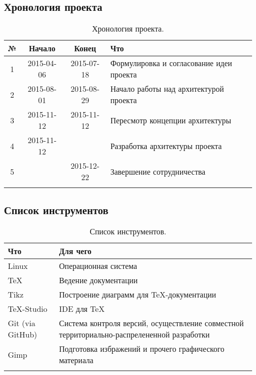 \documentclass[12pt,a4paper,fullpage,titlepage]{article}
\begin{document}
\subsection{Хронология проекта}
\begin{table}[h]
\begin{tabularx}{\textwidth}{|c|c|c|X|}
	\hline
	№ & Начало & Конец & Что\\
	\hline
	1 & 2015-04-06 & 2015-07-18 & Формулировка и согласование идеи проекта \\
	\hline
	2 & 2015-08-01 & 2015-08-29 & Начало работы над архитектурой проекта \\
	\hline
	3 & 2015-11-12 & 2015-11-12 & Пересмотр концепции архитектуры \\
	\hline
	4 & 2015-11-12 &  & Разработка архитектуры проекта\\
	\hline
	5 &  & 2015-12-22 & Завершение сотрудничества \\
	\hline
	&  &  &  \\
	\hline
\end{tabularx}
\caption{Хронология проекта.}
\end{table}

\newpage
\subsection{Список инструментов}
\begin{table}[h]
	\begin{tabularx}{\textwidth}{|l|X|}
		\hline
		Что & Для чего \\
		\hline
		Linux & Операционная система\\
		\hline
		\TeX & Ведение документации\\
		\hline
		Tikz & Построение диаграмм для \TeX-документации\\
		\hline
		\TeX-Studio & IDE для \TeX \\
		\hline
		Git (via GitHub) & Система контроля версий, осуществление совместной территориально-распрелененной разработки \\
		\hline
		Gimp & Подготовка избражений и прочего графического материала \\
		\hline
		& \\
		\hline
	\end{tabularx}
	\caption{Список инструментов.}
\end{table}


\end{document}
